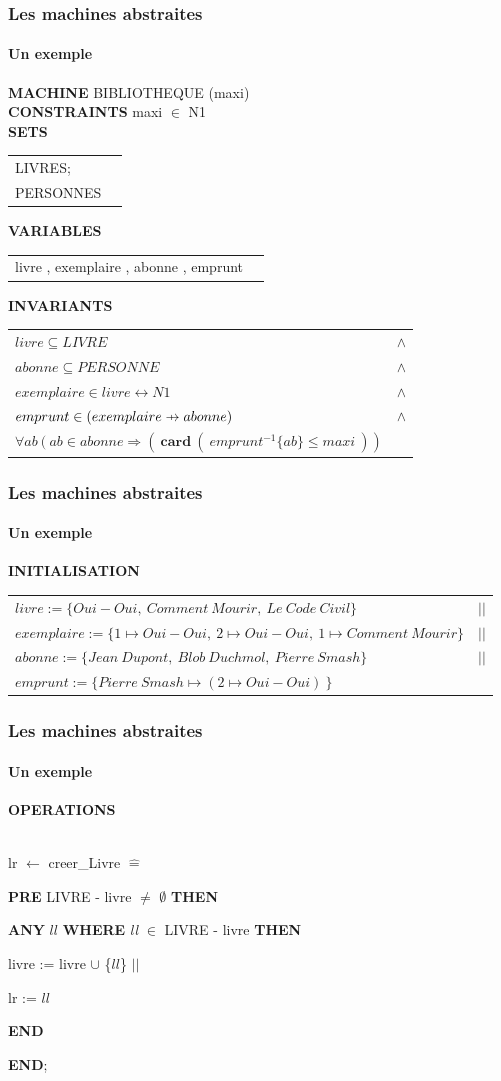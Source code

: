 \documentclass[11pt,a4paper,xcolor=table, handout]{beamer} %
\newcommand{\Bequal}{\mathrel{\widehat{=}}}
\def\p#1{\mathrel{\ooalign{\hfil$\mapstochar\mkern 5mu$\hfil\cr$#1$}}}
\def \pfun  {\p\rightarrow}
\begin{document}
\begin{frame}
\frametitle{Les machines abstraites}
\framesubtitle{Un exemple}
\setlength{\LTpre}{\medskipamount}
\setlength{\LTpost}{0pt}
\setlength\LTleft{\parindent}
\textbf{MACHINE}  BIBLIOTHEQUE (maxi) \\
\noindent\textbf{CONSTRAINTS} maxi $\in$ N1 \\
\noindent\textbf{SETS}
\begin{longtable}{ll} LIVRES; \\ PERSONNES\\ \end{longtable}
\noindent\textbf{VARIABLES}
\begin{longtable}{ll} livre , exemplaire , abonne , emprunt \end{longtable}
\noindent\textbf{INVARIANTS}
\begin{longtable}{ll}
$livre \subseteq LIVRE $ & $\wedge$ \tabularnewline
$abonne \subseteq PERSONNE$ & $\wedge$ \tabularnewline
$exemplaire \in livre \leftrightarrow N1$ & $\wedge$ \tabularnewline
$emprunt \in ( exemplaire \pfun abonne )$ & $\wedge$ \tabularnewline
$\forall ab\ (\ ab \in abonne \Rightarrow (\ \textbf{card}\ (\ emprunt ^{-1}\{ab\} \leq maxi\ ))$ &
\end{longtable}
\end{frame}

\begin{frame}
\frametitle{Les machines abstraites}
\framesubtitle{Un exemple}
\noindent\textbf{INITIALISATION}
\begin{longtable}{ll}
$livre := \{Oui-Oui,\ Comment\ Mourir,\ Le\ Code\ Civil\} $& $||$ \tabularnewline
$exemplaire := \{1 \mapsto Oui-Oui,\ 2 \mapsto Oui-Oui,\ 1 \mapsto Comment\ Mourir\}$ & $||$ \tabularnewline
$abonne := \{Jean\ Dupont,\ Blob\ Duchmol,\ Pierre\ Smash\} $& $||$ \tabularnewline
$emprunt := \{Pierre\ Smash \mapsto ( 2 \mapsto Oui-Oui)\ \}$ &
\end{longtable}
\end{frame}

\begin{frame}
\frametitle{Les machines abstraites}
\framesubtitle{Un exemple}
\noindent \textbf{OPERATIONS}

~\\
\indent lr $\leftarrow$ creer\_Livre $\Bequal$

\textbf{PRE} LIVRE - livre $\neq$ $\emptyset$ \textbf{THEN}

\hspace*{1em} \textbf{ANY} $ll$ \textbf{WHERE}  \emph{ll} $\in$ LIVRE - livre \textbf{THEN} 

\hspace*{2em}  livre := livre $\cup$ \{$ll$\} $||$ 

\hspace*{2em} lr := $ll$

\hspace*{1em} \textbf{END}

\textbf{END};

\end{frame}
\end{document}
